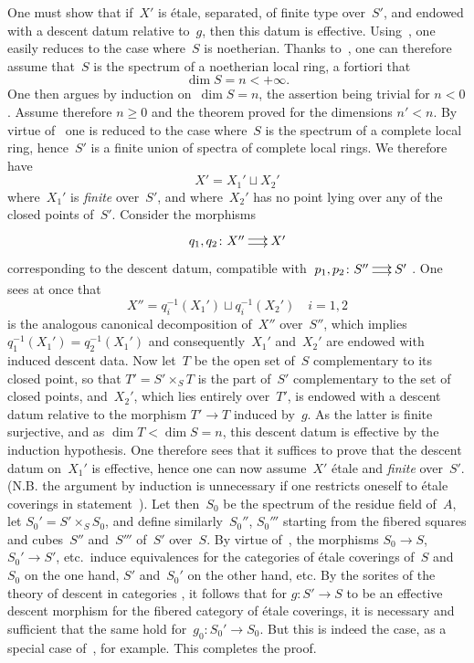 One must show that if~$X'$ is \'etale, separated, of
finite type over~$S'$, and endowed with a descent datum relative
to~$g$, then this datum is effective.
Using~, one easily reduces to the case where~$S$
is noetherian. Thanks to~, one can therefore
assume that~$S$ is the spectrum of a noetherian local ring, a
fortiori that
$$
\dim S=n<+\infty.
$$
One then argues by induction on~$\dim S=n$, the assertion
being trivial for $n<0$. Assume therefore $n\geq 0$ and the
theorem proved for the dimensions $n'<n$. By
virtue of~ one is reduced to the case where~$S$ is the
spectrum of a complete local ring, hence~$S'$ is a finite union
of spectra of complete local rings. We therefore have
$$
X'=X_1'\sqcup X_2'
$$
where~$X_1'$ is \emph{finite} over~$S'$, and where~$X_2'$ has no
point lying over any of the closed points
of~$S'$. Consider the morphisms
$$
\xymatrix@C=.5cm{ q_1,q_2\colon X'' \ar@<2pt>[r] \ar@<-2pt>[r] & X' }
$$
corresponding to the descent datum, compatible with
$\xymatrix@C=.5cm{p_1,p_2\colon S'' \ar@<2pt>[r] \ar@<-2pt>[r] & S'}$. One
sees at once that
$$
X''=q_i^{-1}(X_1')\sqcup q_i^{-1}(X_2')\quad i=1,2
$$
is the analogous canonical decomposition of~$X''$ over~$S''$, which
implies $q_1^{-1}(X_1')=\allowbreak q_2^{-1}(X_1')$ and consequently~$X_1'$ and~$X_2'$
are endowed with induced descent data. Now let~$T$ be the open set
of~$S$ complementary to its closed point, so that $T'=S'\times_S
T$ is the part of~$S'$ complementary to the set of closed
points, and~$X_2'$, which lies entirely over~$T'$,
is endowed with a descent datum relative to the morphism $T'\to
T$ induced by~$g$. As the latter is finite surjective, and as $\dim
T<\dim S=n$, this descent datum is effective by
the induction hypothesis. One therefore sees that it suffices to
prove that the descent datum on~$X_1'$ is effective, hence
one can now assume~$X'$ \'etale and \emph{finite} over~$S'$.
(N.B. the argument by induction is unnecessary if one restricts oneself
to \'etale coverings in statement~).
Let then~$S_0$ be the spectrum of the residue field of~$A$, let
$S_0'=S'\times_S S_0$, and define similarly~$S_0''$, $S_0'''$
starting from the fibered squares and cubes~$S''$ and~$S'''$
of~$S'$ over~$S$. By virtue of~, the morphisms $S_0\to S$,
$S_0'\to S'$, etc.\ induce equivalences for the
categories of \'etale coverings of~$S$ and~$S_0$ on the one
hand, $S'$ and~$S_0'$ on the other hand, etc. By the sorites of
the theory of descent in categories \cite{IX.D}, it follows
that for $g\colon S'\to S$ to be an effective descent morphism
for the fibered category of \'etale coverings, it
is necessary and sufficient that the same hold for~$g_0\colon S_0'\to S_0$.
But this is indeed the case, as a special case of~, for
example. This completes the proof.


